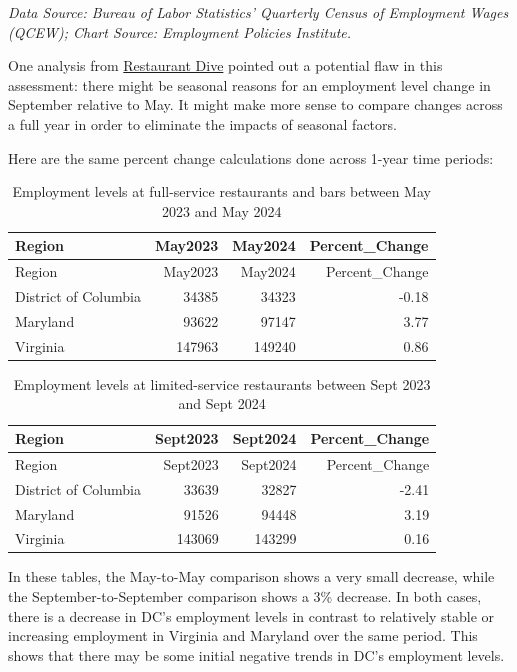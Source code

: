 \documentclass[
  14pt,
]{article}
\begin{document}
\emph{Data Source: Bureau of Labor Statistics' Quarterly Census of
Employment Wages (QCEW); \n Chart Source: Employment Policies
Institute.}

One analysis from
\href{https://www.restaurantdive.com/news/dc-city-council-i-82-wage-hike-pause/749780/}{Restaurant
Dive} pointed out a potential flaw in this assessment: there might be
seasonal reasons for an employment level change in September relative to
May. It might make more sense to compare changes across a full year in
order to eliminate the impacts of seasonal factors.

Here are the same percent change calculations done across 1-year time
periods:

\begin{longtable}[]{@{}lrrr@{}}
\caption{Employment levels at full-service restaurants and bars between
May 2023 and May 2024}\tabularnewline
\toprule\noalign{}
Region & May2023 & May2024 & Percent\_Change \\
\midrule\noalign{}
\endfirsthead
\toprule\noalign{}
Region & May2023 & May2024 & Percent\_Change \\
\midrule\noalign{}
\endhead
\bottomrule\noalign{}
\endlastfoot
District of Columbia & 34385 & 34323 & -0.18 \\
Maryland & 93622 & 97147 & 3.77 \\
Virginia & 147963 & 149240 & 0.86 \\
\end{longtable}

\begin{longtable}[]{@{}lrrr@{}}
\caption{Employment levels at limited-service restaurants between Sept
2023 and Sept 2024}\tabularnewline
\toprule\noalign{}
Region & Sept2023 & Sept2024 & Percent\_Change \\
\midrule\noalign{}
\endfirsthead
\toprule\noalign{}
Region & Sept2023 & Sept2024 & Percent\_Change \\
\midrule\noalign{}
\endhead
\bottomrule\noalign{}
\endlastfoot
District of Columbia & 33639 & 32827 & -2.41 \\
Maryland & 91526 & 94448 & 3.19 \\
Virginia & 143069 & 143299 & 0.16 \\
\end{longtable}

In these tables, the May-to-May comparison shows a very small decrease,
while the September-to-September comparison shows a 3\% decrease. In
both cases, there is a decrease in DC's employment levels in contrast to
relatively stable or increasing employment in Virginia and Maryland over
the same period. This shows that there may be some initial negative
trends in DC's employment levels.
\end{document}
